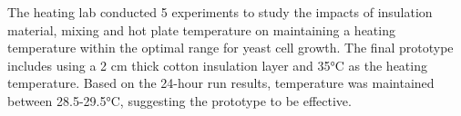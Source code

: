 The heating lab conducted 5 experiments to study the impacts of insulation material, mixing and hot plate temperature on maintaining a heating temperature within the optimal range for yeast cell growth. The final prototype includes using a 2 cm thick cotton insulation layer and 35\si{\celsius} as the heating temperature. Based on the 24-hour run results, temperature was maintained between 28.5-29.5\si{\celsius}, suggesting the prototype to be effective.